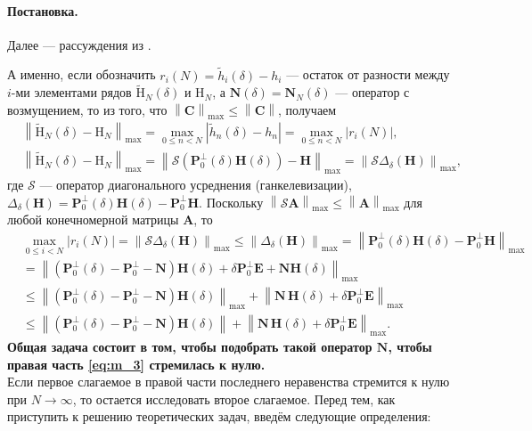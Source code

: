 \documentclass[specialist,
               substylefile = spbu_report.rtx,
               subf,href,colorlinks=true, 12pt]{disser}
\newcommand\norm[1]{\left\|#1\right\|}
\newenvironment{statement}{\paragraph{Постановка.}}{\hfill}
\begin{document}
\begin{statement}
Далее --- рассуждения из \cite[раздел 5.3]{Nekrutkin10}.

А именно, если обозначить $r_i(N)=\widetilde{h}_i(\delta)-h_i$ --- остаток от разности между $i$-ми элементами рядов $\widetilde{\mathrm{H}}_N(\delta)\text{ и }\mathrm{H}_N$, а $\mathbf{N}(\delta) = \mathbf{N}_N(\delta)$ --- оператор с возмущением, то из того, что  $\norm{\mathbf{C}}_{\max}\leqslant \norm{\mathbf{C}}$, получаем
\begin{align*}
	&\norm{\widetilde{\mathrm{H}}_{N}(\delta) - \mathrm{H}_N}_{\max} = \max_{0\leqslant n<N}|\widetilde{h}_n(\delta) - h_n| = \max_{0\leqslant n < N}|r_i(N)|,\\
	&\norm{\widetilde{\mathrm{H}}_{N}(\delta) - \mathrm{H}_N}_{\max} = \norm{\mathcal{S}(\mathbf{P}_0^{\bot}(\delta)\mathbf{H}(\delta)) - \mathbf{H}}_{\max} = \norm{\mathcal{S}\Delta_\delta(\mathbf{H})}_{\max},
\end{align*}
где $\mathcal{S}$ --- оператор диагонального усреднения (ганкелевизации), $\Delta_\delta(\mathbf{H}) = \mathbf{P}_0^\bot(\delta)\mathbf{H}(\delta) - \mathbf{P}_0^\bot\mathbf{H}$. Поскольку $\norm{\mathcal{S}\mathbf{A}}_{\max}\leqslant\norm{\mathbf{A}}_{\max}$ для любой конечномерной матрицы $\mathbf{A}$, то
\begin{align}
	&\max_{0\leqslant i<N} |r_i(N)| = \norm{\mathcal{S}\Delta_\delta(\mathbf{H})}_{\max} \leqslant\norm{\Delta_\delta(\mathbf{H})}_{\max}=\norm{\mathbf{P}_0^\bot(\delta)\mathbf{H}(\delta) - \mathbf{P}_0^\bot\mathbf{H}}_{\max}\nonumber
	\\ 
	&=\norm{(\mathbf{P}_0^\bot(\delta) - \mathbf{P}_0^\bot-\mathbf{N})\mathbf{H}(\delta) + \delta\mathbf{P}_0^\bot\mathbf{E} + \mathbf{N}\mathbf{H}(\delta) }_{\max}\nonumber
	\\
	&\leqslant\norm{(\mathbf{P}_0^\bot(\delta)- \mathbf{P}_0^\bot-\mathbf{N})\mathbf{H}(\delta)}_{\max} + \norm{ \mathbf{N}\, \mathbf{H}(\delta) + \delta \mathbf{P}_0^\perp \mathbf{E}}_{\max}\nonumber
	\\
	&\leqslant\norm{(\mathbf{P}_0^\bot(\delta)- \mathbf{P}_0^\bot-\mathbf{N})\mathbf{H}(\delta)} + \norm{ \mathbf{N}\, \mathbf{H}(\delta) + \delta \mathbf{P}_0^\perp \mathbf{E}}_{\max}.\label{eq:m_3}
\end{align}
{\bf Общая задача состоит в том, чтобы подобрать такой оператор $\mathbf{N}$, чтобы правая часть \eqref{eq:m_3} стремилась к нулю.}
\end{statement}\\
Если первое слагаемое в правой части последнего неравенства  стремится к нулю при $N \rightarrow \infty$, то остается исследовать второе слагаемое. Перед тем, как приступить к решению теоретических задач, введём следующие определения:
\end{document}
